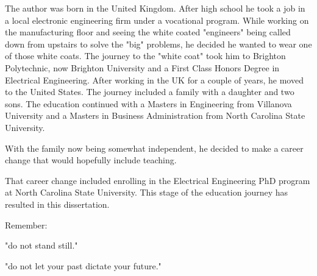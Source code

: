 \begin{biography}
The author was born in the United Kingdom.  After high school he took a job in a local electronic engineering firm
under a vocational program.
While working on the manufacturing floor and seeing the white coated "engineers" being called down from upstairs to solve the "big" problems, he decided he wanted to wear one
of those white coats.
The journey to the "white coat" took him to Brighton Polytechnic, now Brighton University and a First Class Honors Degree in Electrical Engineering.
After working in the UK for a couple of years, he moved to the United States.
The journey included a family with a daughter and two sons.
The education continued with a Masters in Engineering from Villanova University and a Masters in Business Administration from North
Carolina State University.

With the family now being somewhat independent, he decided to make a career change that would hopefully include teaching.

That career change included enrolling in the Electrical Engineering PhD program at North
Carolina State University. This stage of the education journey has resulted in this dissertation.




Remember:

"do not stand still."  

"do not let your past dictate your future."


\end{biography}

